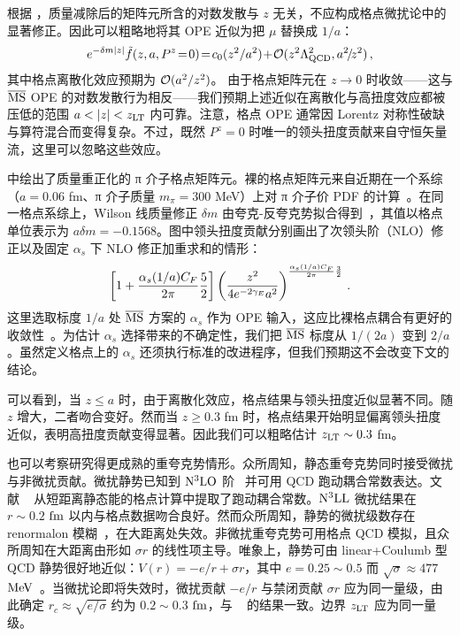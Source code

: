 根据 ，质量减除后的矩阵元所含的对数发散与 $z$ 无关，不应构成格点微扰论中的显著修正。因此可以粗略地将其 OPE 近似为把 $\mu$ 替换成 $1/a$：
\begin{align}\label{eq:subtracted}
	e^{-\delta m |z|}\tilde{f}(z,a,P^z\!=\!0) \!=\! c_0(z^2/a^2) \!+\! {\cal O}(z^2\Lambda_{\rm QCD}^2, a^2\!/\!z^2)\,,
\end{align}
其中格点离散化效应预期为 ${\cal O}(a^2/z^2)$。
由于格点矩阵元在 $z\to0$ 时收敛——这与 ${\overline{\rm MS}}$ OPE 的对数发散行为相反——我们预期上述近似在离散化与高扭度效应都被压低的范围 $a < |z| < z_{\rm LT}$ 内可靠。注意，格点 OPE 通常因 Lorentz 对称性破缺与算符混合而变得复杂。不过，既然 $P^z=0$ 时唯一的领头扭度贡献来自守恒矢量流，这里可以忽略这些效应。

 中绘出了质量重正化的 π 介子格点矩阵元。裸的格点矩阵元来自近期在一个系综（$a=0.06$ fm、π 介子质量 $m_\pi=300$ MeV）上对 π 介子价 PDF 的计算~\cite{Gao:2020ito}。在同一格点系综上，Wilson 线质量修正 $\delta m$ 由夸克-反夸克势拟合得到~\cite{Izubuchi:2019lyk}，其值以格点单位表示为 $a \delta m = -0.1568$。图中领头扭度贡献分别画出了次领头阶（NLO）修正以及固定 $\alpha_s$ 下 NLO 修正加重求和的情形：
\begin{align}
	\left[ 1 + {\alpha_s(1/a)C_F\over 2\pi}  {5\over2}\right]\left({z^2\over 4e^{-2\gamma_E}a^2}\right)^{{\alpha_s(1/a)C_F\over 2\pi}{3\over 2}}\,.
\end{align}
这里选取标度 $1/a$ 处 ${\overline{\rm MS}}$ 方案的 $\alpha_s$ 作为 OPE 输入，这应比裸格点耦合有更好的收敛性~\cite{Lepage:1992xa}。为估计 $\alpha_s$ 选择带来的不确定性，我们把 ${\overline{\rm MS}}$ 标度从 $1/(2a)$ 变到 $2/a$。虽然定义格点上的 $\alpha_s$ 还须执行标准的改进程序，但我们预期这不会改变下文的结论。

可以看到，当 $z\le a$ 时，由于离散化效应，格点结果与领头扭度近似显著不同。随 $z$ 增大，二者吻合变好。然而当 $z\ge 0.3$ fm 时，格点结果开始明显偏离领头扭度近似，表明高扭度贡献变得显著。因此我们可以粗略估计 $z_{\rm LT}\sim 0.3$ fm。

也可以考察研究得更成熟的重夸克势情形。众所周知，静态重夸克势同时接受微扰与非微扰贡献。微扰静势已知到 ${\rm N^3LO}$ 阶~\cite{Smirnov:2009fh}
并可用 QCD 跑动耦合常数表达。文献 ~\cite{Bazavov:2012ka,Bazavov:2014soa,Bazavov:2019qoo} 从短距离静态能的格点计算中提取了跑动耦合常数。${\rm N^3LL}$ 微扰结果在 $r \sim 0.2$ ${\rm fm}$ 以内与格点数据吻合良好。然而众所周知，静势的微扰级数存在 renormalon 模糊~\cite{Beneke:1998rk,Hoang:1998nz}，在大距离处失效。非微扰重夸克势可用格点 QCD 模拟，且众所周知在大距离由形如 $\sigma r$ 的线性项主导。唯象上，静势可由 linear+Coulumb 型 QCD 静势很好地近似：$V(r)=-e/r+\sigma r$，其中 $e= 0.25\sim 0.5$ 而 $\sqrt{\sigma} \approx 477$ ${\rm MeV}$~\cite{Eichten:1974af,Bali:2000gf,Aubin:2004wf}。当微扰论即将失效时，微扰贡献 $-e/r$ 与禁闭贡献 $\sigma r$ 应为同一量级，由此确定 $r_c \approx\sqrt{e/\sigma}$ 约为 $0.2\sim 0.3$ ${\rm fm}$，与 ~\cite{Bali:1999ai,Necco:2001gh,Bazavov:2012ka} 的结果一致。边界 $z_{\rm LT}$ 应为同一量级。

